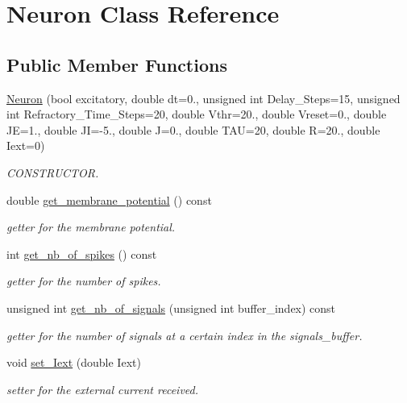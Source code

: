 \hypertarget{classNeuron}{\section{Neuron Class Reference}
\label{classNeuron}
}
\subsection*{Public Member Functions}
\begin{DoxyCompactItemize}
\item 
\hyperlink{classNeuron_a303a198cf7b29291d79c5591cdca1b7b}{Neuron} (bool excitatory, double dt=0., unsigned int Delay\-\_\-\-Steps=15, unsigned int Refractory\-\_\-\-Time\-\_\-\-Steps=20, double Vthr=20., double Vreset=0., double J\-E=1., double J\-I=-\/5., double J=0., double T\-A\-U=20, double R=20., double Iext=0)
\begin{DoxyCompactList}\small\item\em C\-O\-N\-S\-T\-R\-U\-C\-T\-O\-R. \end{DoxyCompactList}\item 
double \hyperlink{classNeuron_aabdf60e772dbc1db9b4d6a4505e1fc5b}{get\-\_\-membrane\-\_\-potential} () const 
\begin{DoxyCompactList}\small\item\em getter for the membrane potential. \end{DoxyCompactList}\item 
int \hyperlink{classNeuron_a54ae4db12ef8d2d009a6cfb6c18652f0}{get\-\_\-nb\-\_\-of\-\_\-spikes} () const 
\begin{DoxyCompactList}\small\item\em getter for the number of spikes. \end{DoxyCompactList}\item 
unsigned int \hyperlink{classNeuron_aeb98031765a52774a87689622f5a53d8}{get\-\_\-nb\-\_\-of\-\_\-signals} (unsigned int buffer\-\_\-index) const 
\begin{DoxyCompactList}\small\item\em getter for the number of signals at a certain index in the signals\-\_\-buffer. \end{DoxyCompactList}\item 
void \hyperlink{classNeuron_abf49994405d8aa85c9256ac0acbb20ac}{set\-\_\-\-Iext} (double Iext)
\begin{DoxyCompactList}\small\item\em setter for the external current received. \end{DoxyCompactList}\item 

\end{DoxyCompactItemize}
